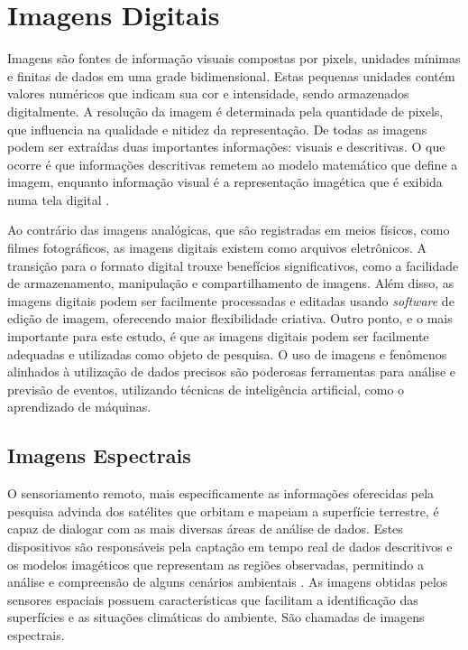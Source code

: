\section{Imagens Digitais}

Imagens são fontes de informação visuais compostas por pixels, unidades mínimas e finitas de dados em uma grade bidimensional. Estas pequenas unidades contém valores numéricos que indicam sua cor e intensidade, sendo armazenados digitalmente. A resolução da imagem é determinada pela quantidade de pixels, que influencia na qualidade e nitidez da representação. De todas as imagens podem ser extraídas duas importantes informações: visuais e descritivas. O que ocorre é que informações descritivas remetem ao modelo matemático que define a imagem, enquanto informação visual é a representação imagética que é exibida numa tela digital \cite{scuri02}.

Ao contrário das imagens analógicas, que são registradas em meios físicos, como filmes fotográficos, as imagens digitais existem como arquivos eletrônicos. A transição para o formato digital trouxe benefícios significativos, como a facilidade de armazenamento, manipulação e compartilhamento de imagens. Além disso, as imagens digitais podem ser facilmente processadas e editadas usando \textit{software} de edição de imagem, oferecendo maior flexibilidade criativa. Outro ponto, e o mais importante para este estudo, é que as imagens digitais podem ser facilmente adequadas e utilizadas como objeto de pesquisa. O uso de imagens e fenômenos alinhados à utilização de dados precisos são poderosas ferramentas para análise e previsão de eventos, utilizando técnicas de inteligência artificial, como o aprendizado de máquinas.

\subsection{Imagens Espectrais}

O sensoriamento remoto, mais especificamente as informações oferecidas pela pesquisa advinda dos satélites que orbitam e mapeiam a superfície terrestre, é capaz de dialogar com as mais diversas áreas de análise de dados. Estes dispositivos são responsáveis pela captação em tempo real de dados descritivos e os modelos imagéticos que representam as regiões observadas, permitindo a análise e compreensão de alguns cenários ambientais \cite{fitz20}. As imagens obtidas pelos sensores espaciais possuem características que facilitam a identificação das superfícies e as situações climáticas do ambiente. São chamadas de imagens espectrais.

